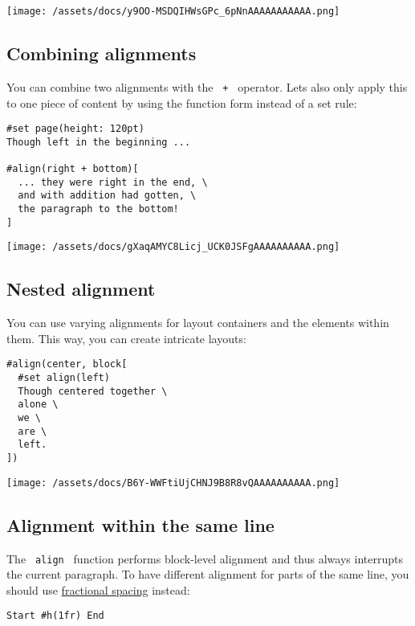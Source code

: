 \texttt{[image: /assets/docs/y9OO-MSDQIHWsGPc\_6pNnAAAAAAAAAAA.png]}

\subsection{Combining alignments}\label{combining-alignments}

You can combine two alignments with the \texttt{\ +\ } operator.
Let\textquotesingle s also only apply this to one piece of content by
using the function form instead of a set rule:

\begin{verbatim}
#set page(height: 120pt)
Though left in the beginning ...

#align(right + bottom)[
  ... they were right in the end, \
  and with addition had gotten, \
  the paragraph to the bottom!
]
\end{verbatim}

\texttt{[image: /assets/docs/gXaqAMYC8Licj\_UCK0JSFgAAAAAAAAAA.png]}

\subsection{Nested alignment}\label{nested-alignment}

You can use varying alignments for layout containers and the elements
within them. This way, you can create intricate layouts:

\begin{verbatim}
#align(center, block[
  #set align(left)
  Though centered together \
  alone \
  we \
  are \
  left.
])
\end{verbatim}

\texttt{[image: /assets/docs/B6Y-WWFtiUjCHNJ9B8R8vQAAAAAAAAAA.png]}

\subsection{Alignment within the same
line}\label{alignment-within-the-same-line}

The \texttt{\ align\ } function performs block-level alignment and thus
always interrupts the current paragraph. To have different alignment for
parts of the same line, you should use
\href{/docs/reference/layout/h/}{fractional spacing} instead:

\begin{verbatim}
Start #h(1fr) End
\end{verbatim}

